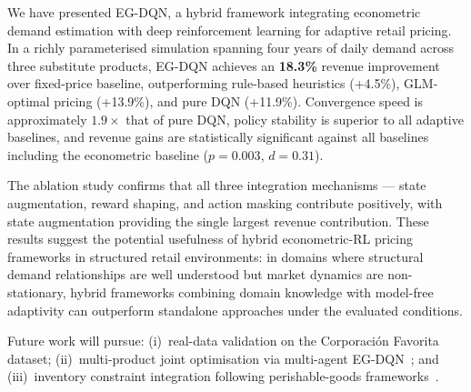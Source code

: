 \documentclass[journal, 10pt, twoside]{IEEEtran}
\begin{document}
We have presented EG-DQN, a hybrid framework integrating econometric
demand estimation with deep reinforcement learning for adaptive retail
pricing. In a richly parameterised simulation spanning four years of
daily demand across three substitute products, EG-DQN achieves an
\textbf{18.3\%} revenue improvement over fixed-price baseline, outperforming
rule-based heuristics (+4.5\%), GLM-optimal pricing (+13.9\%), and pure
DQN (+11.9\%). Convergence speed is approximately $\bm{1.9\times}$ that
of pure DQN, policy stability is superior to all adaptive baselines, and
revenue gains are statistically significant against all baselines
including the econometric baseline ($p=0.003$, $d=0.31$).

The ablation study confirms that all three integration mechanisms ---
state augmentation, reward shaping, and action masking contribute
positively, with state augmentation providing the single largest revenue
contribution. These results suggest the potential usefulness of hybrid econometric-RL pricing frameworks in structured retail environments: in
domains where structural demand relationships are well understood but
market dynamics are non-stationary, hybrid frameworks combining domain
knowledge with model-free adaptivity can outperform standalone approaches under the evaluated conditions.

Future work will pursue: (i)~real-data validation on the Corporaci\'{o}n
Favorita dataset; (ii)~multi-product joint optimisation via multi-agent
EG-DQN~\cite{hadi2025, kumar2026}; and (iii)~inventory constraint
integration following perishable-goods frameworks~\cite{yavuz2024,
nomura2025}.

\balance  %
\end{document}
